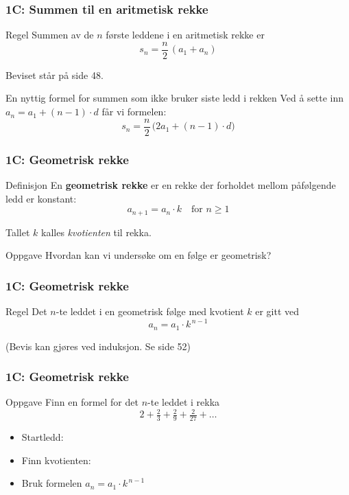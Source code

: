 \blueheader
\begin{frame}
\frametitle{1C: Summen til en aritmetisk rekke }

\begin{red*}{Regel}
Summen av de $n$ første leddene i en aritmetisk rekke er
\[
s_n = \frac{n}{2}\,(a_1 + a_n)
\]

Beviset står på side 48.
\end{red*}

\begin{red*}{En nyttig formel for summen som ikke bruker siste ledd i rekken}
Ved å sette inn $a_n = a_1 + (n-1)\cdot d$ får vi formelen:
\[
s_n = \frac{n}{2}\,\bigl(2a_1 + (n-1)\cdot d\bigr)
\]


\end{red*}

\end{frame}


\blueheader
\begin{frame}
\frametitle{1C: Geometrisk rekke}

\begin{blue*}{Definisjon}
En \textbf{geometrisk rekke} er en rekke der forholdet mellom påfølgende ledd er konstant:
\[
a_{n+1} = a_n \cdot k \quad \text{for } n \ge 1
\]

Tallet $k$ kalles \emph{kvotienten} til rekka.
\end{blue*}



\begin{cyan*}{Oppgave}
Hvordan kan vi undersøke om en følge er geometrisk?
\end{cyan*}

\end{frame}


\blueheader
\begin{frame}
\frametitle{1C: Geometrisk rekke}

\begin{red*}{Regel}
Det $n$-te leddet i en geometrisk følge med kvotient $k$ er gitt ved
\[
a_n = a_1 \cdot k^{\,n-1}
\]

(Bevis kan gjøres ved induksjon. Se side 52)
\end{red*}

\end{frame}

\blueheader
\begin{frame}
\frametitle{1C: Geometrisk rekke}

\begin{cyan*}{Oppgave}
Finn en formel for det $n$-te leddet i rekka
\[
2 + \tfrac{2}{3} + \tfrac{2}{9} + \tfrac{2}{27} + \ldots
\]

\begin{itemize}
    \item Startledd: 
    \item Finn kvotienten: 
    \item Bruk formelen $a_n = a_1 \cdot k^{\,n-1}$
\end{itemize}
\end{cyan*}

\end{frame}


